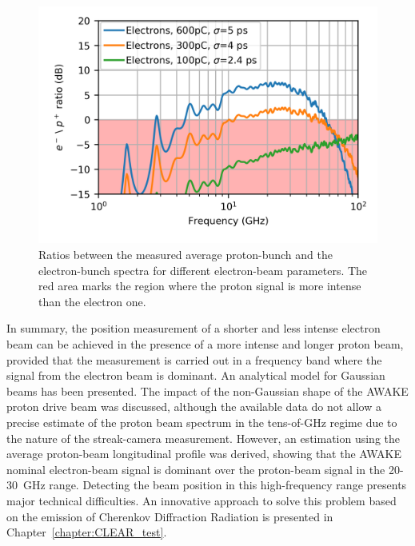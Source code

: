 \newpage

\begin{figure}[!t]
\centering
\includegraphics[scale=1.1, keepaspectratio]{pictures/e_p_ratio_real}
\caption{Ratios between the measured average proton-bunch and the electron-bunch spectra for different electron-beam parameters. The red area marks the region where the proton signal is more intense than the electron one.}
\label{fig:e_p_ratio}
\end{figure}




In summary, the position measurement of a shorter and less intense electron beam can be achieved in the  presence of a more intense and longer proton beam, provided that the measurement is carried out in a frequency band where the signal from the electron beam is dominant. An analytical model for Gaussian beams has been presented. The impact of the non-Gaussian shape of the AWAKE proton drive beam was discussed, although the available data do not allow a precise estimate of the proton beam spectrum in the tens-of-GHz regime due to the nature of the streak-camera measurement. However, an estimation using the average proton-beam longitudinal profile was derived, showing that the AWAKE nominal electron-beam signal is dominant over the proton-beam signal in the 20-30~GHz range. Detecting the beam position in this high-frequency range presents major technical difficulties. An innovative approach to solve this problem based on the emission of Cherenkov Diffraction Radiation is presented in Chapter~\ref{chapter:CLEAR_test}. 